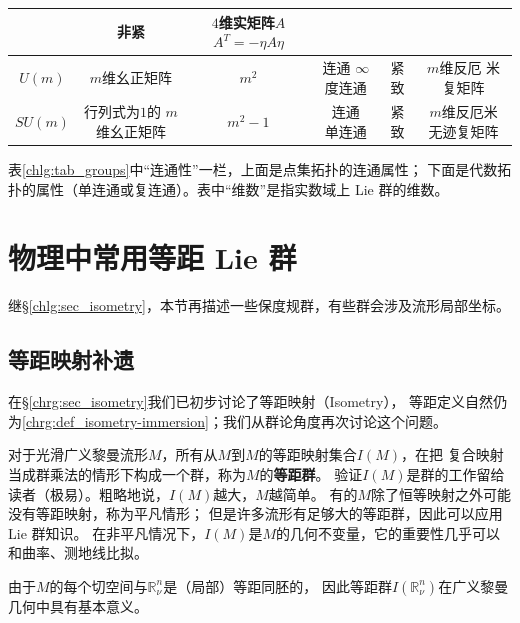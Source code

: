 \begin{table}[htb]
\begin{tabular}{|*6{c|}}
        & 非紧 & \makecell{$4$维实矩阵$A$\\$A^T=- \eta A \eta $} \\ \hline
        $U(m)$ & $m$维幺正矩阵 & $m^2$ & \makecell{连通 \\$\infty$度连通 }
        & 紧致 &  \makecell{$m$维反厄\\ 米复矩阵} \\ \hline
        $SU(m)$ & \makecell{行列式为$1$的\\$m$维幺正矩阵} & $m^2-1$ & \makecell{连通\\单连通 }
        & 紧致 & \makecell{$m$维反厄米\\无迹复矩阵} \\ \hline
    \end{tabular}
\end{table}

{\kaishu 表\ref{chlg:tab_groups}中“连通性”一栏，上面是点集拓扑的连通属性；
下面是代数拓扑的属性（单连通或复连通）。表中“维数”是指实数域上 Lie 群的维数。}



\section{物理中常用等距 Lie 群}\label{chlg:sec_matrixG-II}
继\S\ref{chlg:sec_isometry}，本节再描述一些保度规群\cite{tung-1985}，有些群会涉及流形局部坐标。


\subsection{等距映射补遗}\label{chlg:sec_iso-add}
在\S \ref{chrg:sec_isometry}我们已初步讨论了等距映射（Isometry），
等距定义自然仍为\ref{chrg:def_isometry-immersion}；我们从群论角度再次讨论这个问题。


对于光滑广义黎曼流形$M$，所有从$M$到$M$的等距映射集合$I(M)$，在把
复合映射当成群乘法的情形下构成一个群，称为$M$的\textbf{等距群}。
验证$I(M)$是群的工作留给读者（极易）。粗略地说，$I(M)$越大，$M$越简单。
有的$M$除了恒等映射之外可能没有等距映射，称为平凡情形；
但是许多流形有足够大的等距群，因此可以应用 Lie 群知识。
在非平凡情况下，$I(M)$是$M$的几何不变量，它的重要性几乎可以和曲率、测地线比拟。

由于$M$的每个切空间与$\mathbb{R}^n_\nu$是（局部）等距同胚的，
因此等距群$I(\mathbb{R}^n_\nu)$在广义黎曼几何中具有基本意义。

